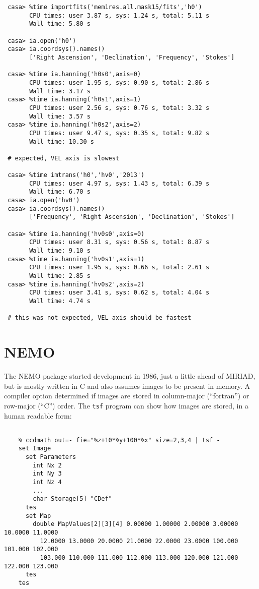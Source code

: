 \documentclass[preprint]{aastex} %
\begin{document}
\footnotesize
\begin{verbatim}
 casa> %time importfits('mem1res.all.mask15/fits','h0')
       CPU times: user 3.87 s, sys: 1.24 s, total: 5.11 s
       Wall time: 5.80 s

 casa> ia.open('h0')
 casa> ia.coordsys().names()
       ['Right Ascension', 'Declination', 'Frequency', 'Stokes']

 casa> %time ia.hanning('h0s0',axis=0)
       CPU times: user 1.95 s, sys: 0.90 s, total: 2.86 s
       Wall time: 3.17 s
 casa> %time ia.hanning('h0s1',axis=1)
       CPU times: user 2.56 s, sys: 0.76 s, total: 3.32 s
       Wall time: 3.57 s
 casa> %time ia.hanning('h0s2',axis=2)
       CPU times: user 9.47 s, sys: 0.35 s, total: 9.82 s
       Wall time: 10.30 s

 # expected, VEL axis is slowest

 casa> %time imtrans('h0','hv0','2013')
       CPU times: user 4.97 s, sys: 1.43 s, total: 6.39 s
       Wall time: 6.70 s
 casa> ia.open('hv0')
 casa> ia.coordsys().names()
       ['Frequency', 'Right Ascension', 'Declination', 'Stokes']

 casa> %time ia.hanning('hv0s0',axis=0)
       CPU times: user 8.31 s, sys: 0.56 s, total: 8.87 s
       Wall time: 9.10 s
 casa> %time ia.hanning('hv0s1',axis=1)
       CPU times: user 1.95 s, sys: 0.66 s, total: 2.61 s
       Wall time: 2.85 s
 casa> %time ia.hanning('hv0s2',axis=2)
       CPU times: user 3.41 s, sys: 0.62 s, total: 4.04 s
       Wall time: 4.74 s

 # this was not expected, VEL axis should be fastest

\end{verbatim}
\normalsize


\section{NEMO}

The NEMO package started development in 1986, just a little 
ahead of MIRIAD, but is mostly written in C and also
assumes images to be present
in memory. A compiler option determined if images are stored
in column-major (``fortran'') or row-major (``C'') order.
The {\tt tsf} program can show how images are
stored, in a human readable form:

\footnotesize
\begin{verbatim}

    % ccdmath out=- fie="%z+10*%y+100*%x" size=2,3,4 | tsf -
    set Image
      set Parameters
        int Nx 2 
        int Ny 3 
        int Nz 4 
        ...
        char Storage[5] "CDef"
      tes
      set Map
        double MapValues[2][3][4] 0.00000 1.00000 2.00000 3.00000 10.0000 11.0000 
          12.0000 13.0000 20.0000 21.0000 22.0000 23.0000 100.000 101.000 102.000 
          103.000 110.000 111.000 112.000 113.000 120.000 121.000 122.000 123.000 
      tes
    tes

\end{verbatim}
\normalsize
\end{document}
